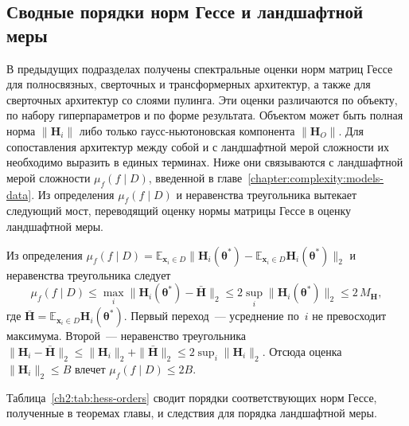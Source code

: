 \subsection{Сводные порядки норм Гессе и ландшафтной меры}\label{ch2:sec:summary-orders}

В предыдущих подразделах получены спектральные оценки норм матриц Гессе для полносвязных, сверточных и трансформерных архитектур, а также для сверточных архитектур со слоями пулинга.
Эти оценки различаются по объекту, по набору гиперпараметров и по форме результата.
Объектом может быть полная норма $\|\mathbf{H}_i\|$ либо только гаусс-ньютоновская компонента $\|\mathbf{H}_O\|$.
Для сопоставления архитектур между собой и с ландшафтной мерой сложности их необходимо выразить в единых терминах.
Ниже они связываются с ландшафтной мерой сложности $\mu_f(f\mid D)$, введенной в главе~\ref{chapter:complexity:models-data}.
Из определения $\mu_f(f\mid D)$ и неравенства треугольника вытекает следующий мост, переводящий оценку нормы матрицы Гессе в оценку ландшафтной меры.

\begin{remark}\label{ch2:lem:bridge-hess-muf}
Из определения $\mu_f(f\mid D)=\mathbb{E}_{\mathbf{x}_i\in D}\bigl\|\mathbf{H}_{i}(\boldsymbol{\theta}^*)-\mathbb{E}_{\mathbf{x}_i\in D}\mathbf{H}_{i}(\boldsymbol{\theta}^*)\bigr\|_2$ и неравенства треугольника следует
\[
  \mu_f(f\mid D)\le \max_i\bigl\|\mathbf{H}_{i}(\boldsymbol{\theta}^*)-\bar{\mathbf{H}}\bigr\|_2
  \le 2\sup_i\bigl\|\mathbf{H}_{i}(\boldsymbol{\theta}^*)\bigr\|_2\le 2\,M_{\mathbf{H}},
\]
где $\bar{\mathbf{H}}=\mathbb{E}_{\mathbf{x}_i\in D}\mathbf{H}_{i}(\boldsymbol{\theta}^*)$. Первый переход~--- усреднение по~$i$ не превосходит максимума. Второй~--- неравенство треугольника $\|\mathbf{H}_i-\bar{\mathbf{H}}\|_2\le\|\mathbf{H}_i\|_2+\|\bar{\mathbf{H}}\|_2\le 2\sup_i\|\mathbf{H}_i\|_2$. Отсюда оценка $\|\mathbf{H}_i\|_2\le B$ влечет $\mu_f(f\mid D)\le 2B$.
\end{remark}

Таблица~\ref{ch2:tab:hess-orders} сводит порядки соответствующих норм Гессе, полученные в теоремах главы, и следствия для порядка ландшафтной меры.

